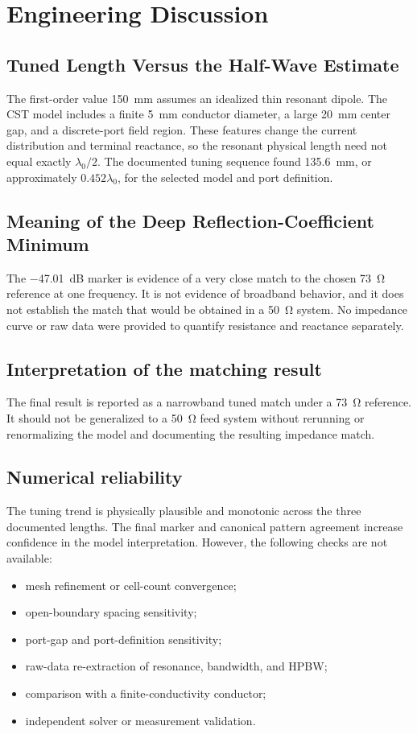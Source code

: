 \section{Engineering Discussion}

\subsection{Tuned Length Versus the Half-Wave Estimate}
The first-order value \SI{150}{mm} assumes an idealized thin resonant dipole. The CST
model includes a finite \SI{5}{mm} conductor diameter, a large \SI{20}{mm} center gap,
and a discrete-port field region. These features change the current distribution and
terminal reactance, so the resonant physical length need not equal exactly
$\lambda_0/2$. The documented tuning sequence found \SI{135.6}{mm}, or
approximately $0.452\lambda_0$, for the selected model and port definition.

\subsection{Meaning of the Deep Reflection-Coefficient Minimum}
The \SI{-47.01}{dB} marker is evidence of a very close match to the chosen
\SI{73}{\ohm} reference at one frequency. It is not evidence of broadband behavior,
and it does not establish the match that would be obtained in a \SI{50}{\ohm} system.
No impedance curve or raw data were provided to quantify resistance and reactance
separately.

\subsection{Interpretation of the matching result}
The final result is reported as a narrowband tuned match under a \SI{73}{\ohm}
reference. It should not be generalized to a \SI{50}{\ohm} feed system without
rerunning or renormalizing the model and documenting the resulting impedance match.

\subsection{Numerical reliability}
The tuning trend is physically plausible and monotonic across the three documented
lengths. The final marker and canonical pattern agreement increase confidence in the
model interpretation. However, the following checks are not available:
\begin{itemize}[leftmargin=2em]
\item mesh refinement or cell-count convergence;
\item open-boundary spacing sensitivity;
\item port-gap and port-definition sensitivity;
\item raw-data re-extraction of resonance, bandwidth, and HPBW;
\item comparison with a finite-conductivity conductor;
\item independent solver or measurement validation.
\end{itemize}

